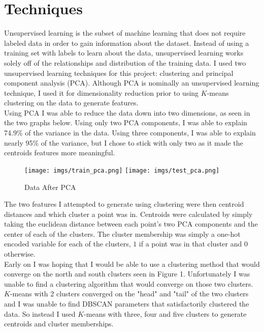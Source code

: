 \documentclass[11pt]{article}
\begin{document}
\section{Techniques}

Unsupervised learning is the subset of machine learning that does not require labeled data in order
to gain information about the dataset. Instead of using a training set with labels to learn about the data,
unsupervised learning works solely off of the relationships and distribution of the training data. I used
two unsupervised learning techniques for this project: clustering and principal component analysis (PCA).
Although PCA is nominally an unsupervised learning technique, I used it for dimensionality reduction prior
to using $K$-means clustering on the data to generate features.\\

Using PCA I was able to reduce the data down into two dimensions, as seen in the two graphs below. Using
only two PCA components, I was able to explain 74.9\% of the variance in the data. Using three components,
I was able to explain nearly 95\% of the variance, but I chose to stick with only two as it made the centroids 
features more meaningful. 

\begin{figure}[h]
\caption{Data After PCA}
\texttt{[image: imgs/train\_pca.png]}
\texttt{[image: imgs/test\_pca.png]}
\centering
\end{figure}

The two features I attempted to generate using clustering were then centroid distances and which cluster a
point was in. Centroids were calculated by simply taking the euclidean distance between each point's two 
PCA components and the center of each of the clusters. The cluster membership was simply a one-hot encoded
variable for each of the clusters, $1$ if a point was in that cluster and $0$ otherwise.\\

Early on I was hoping that I would be able to use a clustering method that would converge on the north and
south clusters seen in Figure 1. Unfortunately I was unable to find a clustering algorithm that
would converge on those two clusters. $K$-means with 2 clusters converged on the "head" and "tail" of the two
clusters and I was unable to find DBSCAN parameters that satisfactorily clustered the data. So instead I used
$K$-means with three, four and five clusters to generate centroids and cluster memberships.\\
\end{document}
